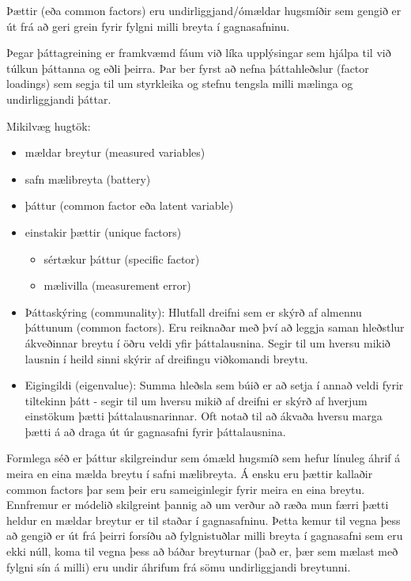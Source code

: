 \documentclass[]{book}
\providecommand{\tightlist}{%
  \setlength{\itemsep}{0pt}\setlength{\parskip}{0pt}}
\begin{document}
Þættir (eða common factors) eru undirliggjand/ómældar hugsmíðir sem gengið er út frá að geri grein fyrir fylgni milli breyta í gagnasafninu.

Þegar þáttagreining er framkvæmd fáum við líka upplýsingar sem hjálpa til við túlkun þáttanna og eðli þeirra. Þar ber fyrst að nefna þáttahleðslur (factor loadings) sem segja til um styrkleika og stefnu tengsla milli mælinga og undirliggjandi þáttar.

Mikilvæg hugtök:

\begin{itemize}
\tightlist
\item
  mældar breytur (measured variables)
\item
  safn mælibreyta (battery)
\item
  þáttur (common factor eða latent variable)
\item
  einstakir þættir (unique factors)

  \begin{itemize}
  \tightlist
  \item
    sértækur þáttur (specific factor)
  \item
    mælivilla (measurement error)
  \end{itemize}
\item
  Þáttaskýring (communality): Hlutfall dreifni sem er skýrð af almennu þáttunum (common factors). Eru reiknaðar með því að leggja saman hleðstlur ákveðinnar breytu í öðru veldi yfir þáttalausnina. Segir til um hversu mikið lausnin í heild sinni skýrir af dreifingu viðkomandi breytu.
\item
  Eigingildi (eigenvalue): Summa hleðsla sem búið er að setja í annað veldi fyrir tiltekinn þátt - segir til um hversu mikið af dreifni er skýrð af hverjum einstökum þætti þáttalausnarinnar. Oft notað til að ákvaða hversu marga þætti á að draga út úr gagnasafni fyrir þáttalausnina.
\end{itemize}

Formlega séð er þáttur skilgreindur sem ómæld hugsmíð sem hefur línuleg áhrif á meira en eina mælda breytu í safni mælibreyta. Á ensku eru þættir kallaðir common factors þar sem þeir eru sameiginlegir fyrir meira en eina breytu. Ennfremur er módelið skilgreint þannig að um verður að ræða mun færri þætti heldur en mældar breytur er til staðar í gagnasafninu. Þetta kemur til vegna þess að gengið er út frá þeirri forsíðu að fylgnistuðlar milli breyta í gagnasafni sem eru ekki núll, koma til vegna þess að báðar breyturnar (það er, þær sem mælast með fylgni sín á milli) eru undir áhrifum frá sömu undirliggjandi breytunni.
\end{document}
